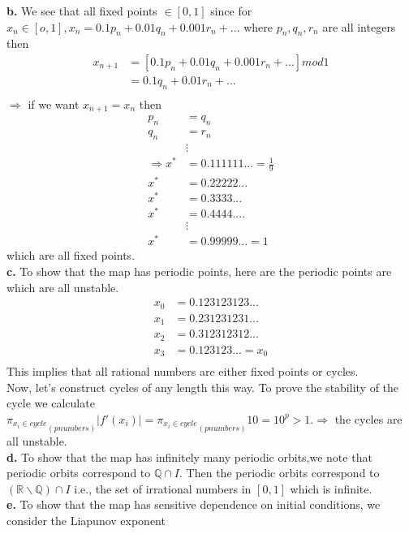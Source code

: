 \documentclass[12pt]{article}
\begin{document}
	{\bf b. } We see that all fixed points $\in [0,1]$ since for $x_n \in [o,1], x_n=0.1 p_n+0.01q_n+0.001r_n+...$ where $p_n,q_n,r_n$ are all integers then \\
	\begin{align*}
	x_{n+1}&=[0.1 p_n+0.01q_n+0.001r_n+...]mod1\\
	&=0.1 q_n+0.01r_n+...\\
	\end{align*} 
	$\Rightarrow$ if we want $x_{n+1}=x_n$ then \\
	\begin{align*}
	p_n &=q_n\\            
	q_n &=r_n \\
	&\vdots\\
	\Rightarrow x^* &= 0.111111...=\frac{1}{9}\\
	x^*&= 0.22222...\\
	x^*&= 0.3333...\\
	x^*&=0.4444....\\
	& \vdots \\
	x^*&= 0.99999...=1
	\end{align*}
	which are all fixed points.\\
	{\bf c. } To show that the map has periodic points, here are the periodic points are which are all unstable. \\
	\begin{align*}
	x_0&=0.123123123...\\
	x_1&=0.231231231...\\
	x_2&=0.312312312...\\
	x_3&=0.123123...=x_0\\
	\end{align*} 
	This implies that all rational numbers are either fixed points or cycles.\\
	Now, let's construct cycles of any length this way. To prove the stability of the cycle we calculate ${\pi_{x_i \in cycle}}_{\left(p numbers\right)} |f'(x_i)|= {\pi_{x_i \in cycle}}_{\left(p numbers\right)} 10 =10^p >1. \Rightarrow$ the cycles are all unstable.\\
	{\bf d. } To show that the map has infinitely many periodic orbits,we note that periodic orbits correspond to $\mathbb{Q}\cap I.$ Then the periodic orbits correspond to $(\mathbb{R} \backslash \mathbb{Q})\cap I$ i.e., the set of irrational numbers in $[0,1]$ which is infinite. \\
	{\bf e. } To show that the map has sensitive dependence on initial conditions, we consider the Liapunov exponent
\end{document}
